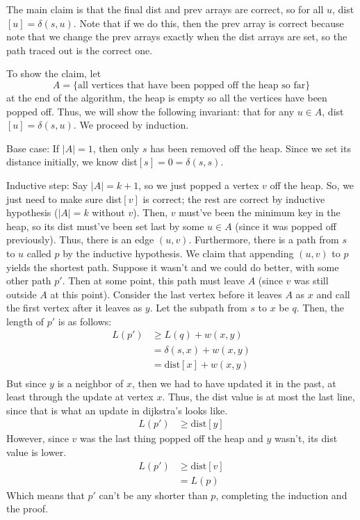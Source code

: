 \begin{algothm}
    The main claim is that the final dist and prev arrays are correct, so for all $u$, dist$[u] = \delta(s, u)$. Note that if we do this,
    then the prev array is correct because note that we change the prev arrays exactly when the dist arrays are set, so the path traced out
    is the correct one.

    To show the claim, let \[A = \{ \text{all vertices that have been popped off the heap so far} \}\]
    at the end of the algorithm, the heap is empty so all the vertices have been popped off. Thus, we will show the following invariant:
    that for any $u \in A$, dist$[u] = \delta(s, u)$. We proceed by induction.

    Base case: If $|A| = 1$, then only $s$ has been removed off the heap. Since we set its distance initially, we know dist$[s] = 0 = \delta(s, s)$.

    Inductive step: Say $|A| = k + 1$, so we just popped a vertex $v$ off the heap. So, we just need to make sure dist$[v]$ is correct; the rest are correct
    by inductive hypothesis ($|A| = k$ without $v$). Then, $v$ must've been the minimum key in the heap, so its dist must've been set last by some $u \in A$ (since it was popped off previously).
    Thus, there is an edge $(u, v)$. Furthermore, there is a path from $s$ to $u$ called $p$ by the inductive hypothesis. We claim that appending $(u, v)$ to $p$
    yields the shortest path. Suppose it wasn't and we could do better, with some other path $p'$. Then at some point, this path must leave $A$ (since $v$ was still outside $A$ at this point).
    Consider the last vertex before it leaves $A$ as $x$ and call the first vertex after it leaves as $y$. Let the subpath from $s$ to $x$ be $q$. Then, the length of $p'$ is as follows:
    \begin{align*}
        L(p') &\geq L(q) + w(x, y) \\
        &= \delta(s, x) + w(x, y) \\
        &= \text{dist}[x] + w(x, y) \\
    \end{align*} 
    But since $y$ is a neighbor of $x$, then we had to have updated it in the past, at least through the update at vertex $x$. Thus,
    the dist value is at most the last line, since that is what an update in dijkstra's looks like.
    \begin{align*}
        L(p') &\geq \text{dist}[y]
    \end{align*}
    However, since $v$ was the last thing popped off the heap and $y$ wasn't, its dist value is lower.
    \begin{align*}
        L(p') &\geq \text{dist}[v] \\
        &= L(p)
    \end{align*}
    Which means that $p'$ can't be any shorter than $p$, completing the induction and the proof.
\end{algothm}
